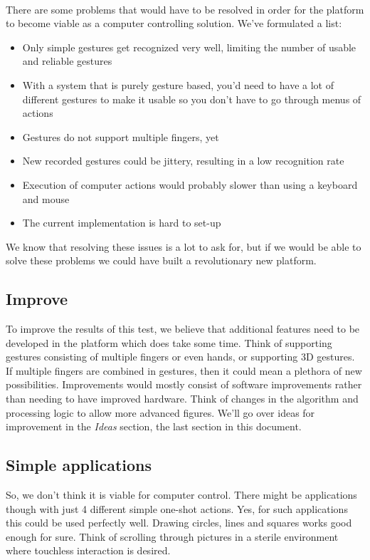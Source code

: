 \documentclass[a4paper]{article}
\providecommand{\tightlist}{%
\setlength{\itemsep}{0pt}\setlength{\parskip}{0pt}}
\begin{document}
  \paragraph{}
  There are some problems that would have to be resolved in order for the
  platform to become viable as a computer controlling solution. We've formulated
  a list:

  \begin{itemize}
    \tightlist
    \item Only simple gestures get recognized very well, limiting the number of
      usable and reliable gestures
    \item With a system that is purely gesture based, you'd need to have a lot
      of different gestures to make it usable so you don't have to go through
      menus of actions
    \item Gestures do not support multiple fingers, yet
    \item New recorded gestures could be jittery, resulting in a low recognition
      rate
    \item Execution of computer actions would probably slower than using a
      keyboard and mouse
    \item The current implementation is hard to set-up
  \end{itemize}

  We know that resolving these issues is a lot to ask for, but if we would be able to solve these
  problems we could have built a revolutionary new platform.

  \subsection*{Improve}
  To improve the results of this test, we believe that additional features need
  to be developed in the platform which does take some time. Think of supporting
  gestures consisting of multiple fingers or even hands, or supporting 3D
  gestures. If multiple fingers are combined in gestures, then it could mean a
  plethora of new possibilities. Improvements would mostly consist of software improvements rather
  than needing to have improved hardware. Think of changes in the algorithm and
  processing logic to allow more advanced figures. We'll go over ideas for
  improvement in the \emph{Ideas} section, the last section in this document.

  \subsection*{Simple applications}
  So, we don't think it is viable for computer control. There might be
  applications though with just 4 different simple one-shot actions.
  Yes, for such applications this could be used perfectly well. Drawing circles,
  lines and squares works good enough for sure. Think of scrolling through
  pictures in a sterile environment where touchless interaction is desired.
\end{document}
